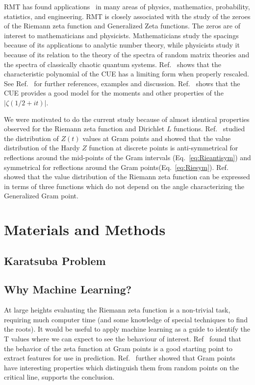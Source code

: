 \documentclass[twoside]{article}
\begin{document}
RMT has found applications~\cite{KeatingSnaith 2000,Odlyzko 1992} 
in many areas of physics, mathematics,  probability, statistics, and engineering. 
 RMT is closely associated with the study of the zeroes of the Riemann zeta function 
 and Generalized Zeta functions. The zeros are of interest to mathematicians and physicists. 
Mathematicians 
study the spacings because of its applications to analytic number theory, 
while physicists study it because of its  relation 
to the theory of the spectra of random matrix theories 
and the spectra of classically chaotic quantum systems.
Ref.~\cite{Chhaibi 2014} shows that the characteristic polynomial 
of the CUE has a limiting form when properly rescaled. 
See Ref.~\cite{Francesco 2007,os6, Hanga 2020} for  further references,
examples and discussion. 
 Ref.~\cite{KeatingSnaith 2000} shows that the CUE provides
a good model for the moments and other properties of the $|\zeta(1/2 + it)|$.

We were motivated to do the current study because of almost identical 
properties observed
for the Riemann zeta function and Dirichlet $L$ functions. 
Ref.~\cite{Shanker 2018a,Shanker 2018b} studied 
the distribution of $Z(t)$ values 
at Gram points and showed  that  the  value
distribution of the Hardy $Z$ function at discrete points is anti-symmetrical for 
reflections around the mid-points of the Gram intervals (Eq.~\ref{eq:Rieantisym}) 
and symmetrical for reflections around the Gram points(Eq.~\ref{eq:Riesym}). 
Ref.~\cite{Shanker 2020} showed that the value distribution of the Riemann zeta function 
can be expressed in terms of three  functions 
 which do not depend on the angle characterizing the Generalized Gram point. 

\section{\label{sec2}Materials and Methods}

\subsection{\label{seckaratsuba}Karatsuba Problem}


\subsection{\label{secwhy}Why Machine Learning?}

At large heights evaluating the Riemann zeta function  is a non-trivial task, requiring much computer time 
(and some knowledge of special techniques to find the roots).  It would be useful to apply
machine learning
as a guide to identify the T values where we can expect to see the behaviour of interest.
Ref~\cite{osneural} found that the behavior of the zeta function at Gram points 
is a good starting point to extract features for use in prediction. 
Ref.~\cite{Shanker 2018a} further showed that Gram points have interesting properties 
which distinguish them from random points on the critical line, supports the conclusion. 
\end{document}
